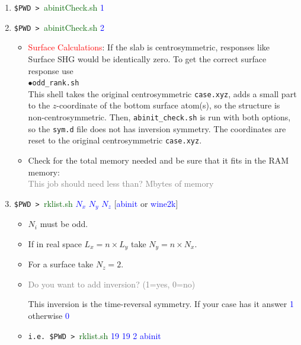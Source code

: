 \documentclass[12pt,leqno]{article}
\numberwithin{equation}{section}
\begin{document}
\begin{enumerate}
\begin{itemize}
\end{itemize}
\item \verb=$PWD > =\textcolor{darkgreen}{abinitCheck.sh} \textcolor{blue}{1} 
\item \verb=$PWD > =\textcolor{darkgreen}{abinitCheck.sh} \textcolor{blue}{2} 
\begin{itemize}
\item \textcolor{red}{Surface Calculations}: If the slab is
  centrosymmetric, responses like  Surface SHG would be identically
  zero. To get the correct surface response use\\
$\bullet$\verb=odd_rank.sh=\\
This shell takes the original centrosymmetric \verb=case.xyz=, adds a
small part to the $z$-coordinate of the bottom surface atom(s), so the
structure is non-centrosymmetric. 
Then, \verb=abinit_check.sh= is run with both options, so the
\verb=sym.d= file does not has inversion symmetry.  
The coordinates are reset to the original centrosymmetric \verb=case.xyz=.  
\item Check for the total memory needed and be sure that it fits in the RAM memory:\\
\textcolor{gray}{This job should need less than\hfill ? Mbytes of memory}
\end{itemize}
\item \verb=$PWD > =\textcolor{darkgreen}{rklist.sh}
\textcolor{blue}{ $N_x$ $N_y$ $N_z$} [\textcolor{blue}{abinit} or \textcolor{blue}{wine2k}]
\begin{itemize}

\item {\small $N_i$ must be odd.}
\item {\small If in real space $L_x=n\times L_y$ take
$N_y= n\times N_x$.}
\item {\small For a surface take $N_z=2$.}
\item 
\textcolor{gray}{Do you want to add inversion? (1=yes, 0=no)}

This inversion is the time-reversal symmetry. If your case has
it answer \textcolor{blue}{1} 
otherwise \textcolor{blue}{0} 

\item{\small \verb=i.e. $PWD > =\textcolor{darkgreen}{rklist.sh}
\textcolor{blue}{ 19 19 2 abinit}

}
\end{itemize}
\end{enumerate}
\end{document}

